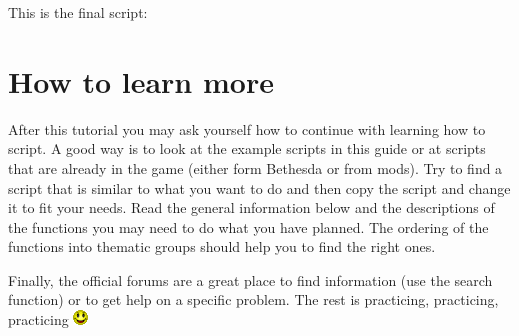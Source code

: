 This is the final script:



\hypertarget{how-to-learn-more}{%
\section{How to learn more}\label{how-to-learn-more}}

After this tutorial you may ask yourself how to continue with learning
how to script. A good way is to look at the example scripts in this
guide or at scripts that are already in the game (either form Bethesda
or from mods). Try to find a script that is similar to what you want to
do and then copy the script and change it to fit your needs. Read the
general information below and the descriptions of the functions you may
need to do what you have planned. The ordering of the functions into
thematic groups should help you to find the right ones.

Finally, the official forums are a great place to find information (use
the search function) or to get help on a specific problem. The rest is
practicing, practicing, practicing \includegraphics{media/image5.png}
